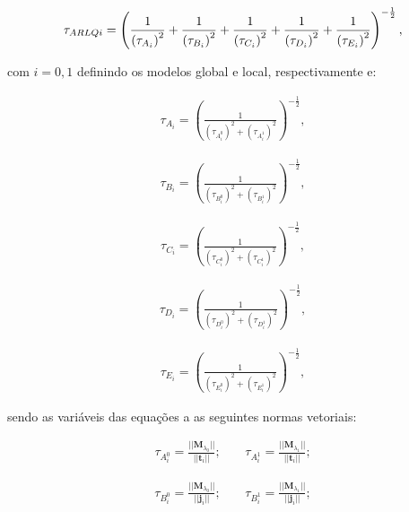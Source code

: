 \begin{align}
	\tau_{ARLQi} = \left(\frac{1}{\left(\tau_{A_i}\right)^{2}} + \frac{1}{\left(\tau_{B_i}\right)^{2}} +  \frac{1}{\left(\tau_{C_i}\right)^{2}} + 
	\frac{1}{\left(\tau_{D_i}\right)^{2}} +
	\frac{1}{\left(\tau_{E_i}\right)^{2}}
	\right)^{-\frac{1}{2}},
\end{align}

\noindent com $i=0,1$ definindo os modelos global e local, respectivamente e:

\begin{align}
	\tau_{A_{i}} = \left(\frac{1}{\left(\tau_{A_i^{0}}\right)^{2} + \left(\tau_{A_i^{1}}\right)^{2}} \right)^{-\frac{1}{2}}, \label{eq:tAi}
\end{align}

\begin{align}
	\tau_{B_{i}} = \left(\frac{1}{\left(\tau_{B_i^{0}}\right)^{2} + \left(\tau_{B_i^{1}}\right)^{2}} \right)^{-\frac{1}{2}},
\end{align}

\begin{align}
	\tau_{C_{i}} = \left(\frac{1}{\left(\tau_{C_i^{0}}\right)^{2} + \left(\tau_{C_i^{1}}\right)^{2}} \right)^{-\frac{1}{2}},
\end{align}

\begin{align}
	\tau_{D_{i}} = \left(\frac{1}{\left(\tau_{D_i^{0}}\right)^{2} + \left(\tau_{D_i^{1}}\right)^{2}} \right)^{-\frac{1}{2}},
\end{align}

\begin{align}
	\tau_{E_{i}} = \left(\frac{1}{\left(\tau_{E_i^{0}}\right)^{2} + \left(\tau_{E_i^{1}}\right)^{2}} \right)^{-\frac{1}{2}},\label{eq:tEi}
\end{align}

\noindent sendo as variáveis das equações  a  as seguintes normas vetoriais:

\begin{align}
	\tau_{A_i^{0}} = \frac{|| \mathbf{M}_{\lambda_0} || }{||\mathbf{t}_{i} ||}; \ \ \ \ \  & \tau_{A_i^{1}} = \frac{|| \mathbf{M}_{\lambda_1} || }{||\mathbf{t}_{i} ||};
\end{align}

\begin{align}
	\tau_{B_i^{0}} = \frac{|| \mathbf{M}_{\lambda_0} || }{||\mathbf{j}_{i} ||}; \ \ \ \ \  &  \tau_{B_i^{1}} = \frac{|| \mathbf{M}_{\lambda_1} || }{||\mathbf{j}_{i} ||}; 
\end{align}


